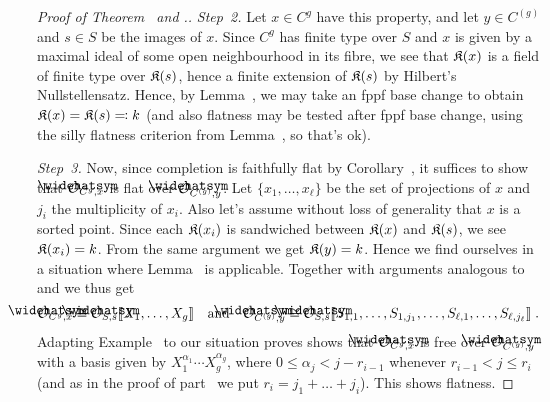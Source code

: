 \documentclass[a4paper,parskip=half,numbers=enddot, DIV=12]{scrreprt}
\renewcommand{\leq}{\leqslant}
\begin{document}
\begin{proof}[Proof of Theorem~ and .]
	\emph{Step~2.} Let $x\in C^g$ have this property, and let $y\in C^{(g)}$ and $s\in S$ be the images of $x$. Since $C^g$ has finite type over $S$ and $x$ is given by a maximal ideal of some open neighbourhood in its fibre, we see that $\mathfrak{K}(x)$ is a field of finite type over $\mathfrak{K}(s)$, hence a finite extension of $\mathfrak{K}(s)$ by Hilbert's Nullstellensatz. Hence, by Lemma~, we may take an fppf base change to obtain $\mathfrak{K}(x)=\mathfrak{K}(s)\eqqcolon k$ (and also flatness may be tested after fppf base change, using the silly flatness criterion from Lemma~, so that's ok). 
	
	\emph{Step~3.} Now, since completion is faithfully flat by Corollary~, it suffices to show that $\roof{\Oo}_{C^g,x}$ is flat over $\roof{\Oo}_{C^{(g)},y}$. Let $\{x_1,\ldots,x_\ell\}$ be the set of projections of $x$ and $j_i$ the multiplicity of $x_i$. Also let's assume without loss of generality that $x$ is a sorted point. Since each $\mathfrak{K}(x_i)$ is sandwiched between $\mathfrak{K}(x)$ and $\mathfrak{K}(s)$, we see $\mathfrak{K}(x_i)=k$. From the same argument we get $\mathfrak{K}(y)=k$. Hence we find ourselves in a situation where Lemma~ is applicable. Together with arguments analogous to  and  we thus get
	\begin{align*}
		\roof{\Oo}_{C^g,x}\cong \roof{\Oo}_{S,s}\llbracket X_1,\ldots,X_g\rrbracket\quad\text{and}\quad\roof{\Oo}_{C^{(g)},y}\cong \roof{\Oo}_{S,s}\llbracket S_{1,1},\ldots,S_{1,j_1},\ldots,S_{\ell,1},\ldots,S_{\ell,j_\ell}\rrbracket\;.
	\end{align*}
	Adapting Example~ to our situation proves shows that $\roof{\Oo}_{C^g,x}$ is free over $\roof{\Oo}_{C^{(g)},y}$ with a basis given by $X_1^{\alpha_1}\cdots X_g^{\alpha_g}$, where $0\leq \alpha_j<j-r_{i-1}$ whenever $r_{i-1}<j\leq r_i$ (and as in the proof of part~ we put $r_i=j_1+\ldots+j_i$). This shows flatness.
	

\end{proof}
\end{document}
